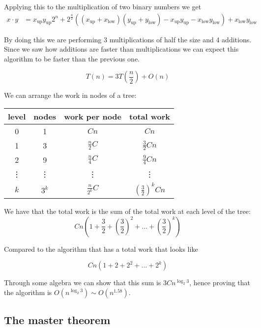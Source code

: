 \documentclass[10pt]{extarticle}
\begin{document}
Applying this to the multiplication of two binary numbers we get
\begin{align*}
    x \cdot y & = x_{\text{up}} y_{\text{up}} 2^n
    + 2^\frac{n}{2}((x_{\text{up}} + x_{\text{low}})(y_{\text{up}} + y_{\text{low}}) - x_{\text{up}}y_{\text{up}} - x_{\text{low}}y_{\text{low}}) + x_{\text{low}}y_{\text{low}}
\end{align*}

By doing this we are performing 3 multiplications of half the size and 4 additions.
Since we saw how additions are faster than multiplications we can expect this algorithm to be faster than the previous one.

$$
    T(n) = 3T\left(\frac{n}{2}\right) + O(n)
$$

We can arrange the work in nodes of a tree:

\begin{center}
    \begin{tabular}{ |c|c|c|c| }
        \hline
        level  & nodes  & work per node    & total work                      \\
        \hline
        0      & 1      & $Cn$             & $Cn$                            \\
        1      & 3      & $\frac{n}{2}C$   & $\frac{3}{2}Cn$                 \\
        2      & 9      & $\frac{n}{4}C$   & $\frac{9}{4}Cn$                 \\
        \vdots & \vdots & \vdots           & \vdots                          \\
        $k$    & $3^k$  & $\frac{n}{2^k}C$ & $\left(\frac{3}{2}\right)^k Cn$ \\
        \hline
    \end{tabular}
\end{center}

We have that the total work is the sum of the total work at each level of the tree:
$$
    Cn\left(1+\frac{3}{2}+\left(\frac{3}{2}\right)^2+\dots+\left(\frac{3}{2}\right)^k\right)
$$

Compared to the  algorithm that has a total work that looks like

$$
    Cn\left(1+2+2^2+\dots+2^k\right)
$$

Through some algebra we can show that this sum is $3Cn^{\log_{2}3}$,
hence proving that the algorithm is $O(n^{\log_{2}3}) \sim O(n^{1.58})$.

\subsection{The master theorem}
\end{document}
